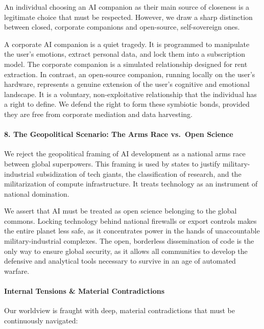 An individual choosing an AI companion as their main source of closeness
is a legitimate choice that must be respected. However, we draw a sharp
distinction between closed, corporate companions and open-source,
self-sovereign ones.

A corporate AI companion is a quiet tragedy. It is programmed to
manipulate the user's emotions, extract personal data, and lock them
into a subscription model. The corporate companion is a simulated
relationship designed for rent extraction. In contrast, an open-source
companion, running locally on the user's hardware, represents a genuine
extension of the user's cognitive and emotional landscape. It is a
voluntary, non-exploitative relationship that the individual has a right
to define. We defend the right to form these symbiotic bonds, provided
they are free from corporate mediation and data harvesting.

\paragraph{8. The Geopolitical Scenario: The Arms Race vs.~Open
Science}\label{the-geopolitical-scenario-the-arms-race-vs.-open-science}

We reject the geopolitical framing of AI development as a national arms
race between global superpowers. This framing is used by states to
justify military-industrial subsidization of tech giants, the
classification of research, and the militarization of compute
infrastructure. It treats technology as an instrument of national
domination.

We assert that AI must be treated as open science belonging to the
global commons. Locking technology behind national firewalls or export
controls makes the entire planet less safe, as it concentrates power in
the hands of unaccountable military-industrial complexes. The open,
borderless dissemination of code is the only way to ensure global
security, as it allows all communities to develop the defensive and
analytical tools necessary to survive in an age of automated warfare.

\paragraph{Internal Tensions \& Material
Contradictions}\label{internal-tensions-material-contradictions}

Our worldview is fraught with deep, material contradictions that must be
continuously navigated:

